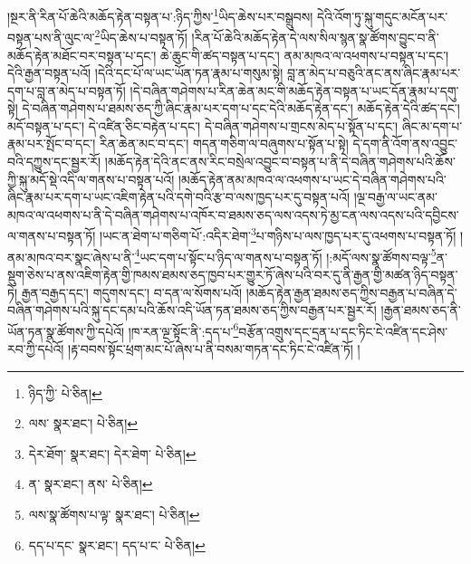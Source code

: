 །སྔར་ནི་རིན་པོ་ཆེའི་མཆོད་རྟེན་བསྟན་པ་:ཉིད་ཀྱིས་\footnote{ཉིད་ཀྱི་  པེ་ཅིན། }ཡིད་ཆེས་པར་བསྒྲུབས། དེའི་འོག་ཏུ་སྐུ་གདུང་མངོན་པར་བསྟན་པས་ནི་ལུང་ལ་\footnote{ལས་  སྣར་ཐང་།  པེ་ཅིན། }ཡིད་ཆེས་པ་བསྟན་ཏོ། །རིན་པོ་ཆེའི་མཆོད་རྟེན་དེ་ལས་སིལ་སྙན་སྣ་ཚོགས་བྱུང་བ་ནི་མཆོད་རྟེན་མཐོང་བར་བསྟན་པ་དང་། ཆེ་ཆུང་གི་ཚད་བསྟན་པ་དང་། ནམ་མཁའ་ལ་འཕགས་པ་བསྟན་པ་དང་། དེའི་རྒྱན་བསྟན་པའོ། །དེའི་དང་པོ་ལ་ཡང་ཡོན་ཏན་རྣམ་པ་གསུམ་སྟེ། བླ་ན་མེད་པ་བཅུའི་ནང་ནས་ཞིང་རྣམ་པར་དག་པ་བླ་ན་མེད་པ་བསྟན་ཏོ། །དེ་བཞིན་གཤེགས་པ་རིན་ཆེན་མང་གི་མཆོད་རྟེན་བསྟན་པ་ཡང་དོན་རྣམ་པ་དགུ་སྟེ། དེ་བཞིན་གཤེགས་པ་ཐམས་ཅད་ཀྱི་ཞིང་རྣམ་པར་དག་པ་དང་དེའི་མཆོད་རྟེན་དང་། མཆོད་རྟེན་དེའི་ཚད་དང་། མདོ་བསྟན་པ་དང་། དེ་འཛིན་ཅིང་བརྟེན་པ་དང་། དེ་བཞིན་གཤེགས་པ་གྲངས་མེད་པ་སྟོན་པ་དང་། ཞིང་མ་དག་པ་རྣམ་པར་སྤོང་བ་དང་། རིན་ཆེན་མང་བ་དང་། གདན་གཅིག་ལ་བཞུགས་པ་སྟོན་པ་སྟེ། དེ་དག་ནི་འོག་ནས་འབྱུང་བའི་དཀྱུས་དང་སྦྱར་རོ། །མཆོད་རྟེན་དེའི་ནང་ནས་རིང་བསྲེལ་འབྱུང་བ་བསྟན་པ་ནི་དེ་བཞིན་གཤེགས་པའི་ཆོས་ཀྱི་སྐུ་མདོ་སྡེ་འདི་ལ་གནས་པ་བསྟན་པའོ། །མཆོད་རྟེན་ནམ་མཁའ་ལ་འཕགས་པ་ཡང་དེ་བཞིན་གཤེགས་པའི་ཞིང་རྣམ་པར་དག་པ་ཡང་འཇིག་རྟེན་པའི་དགེ་བའི་རྩ་བ་ལས་ཁྱད་པར་དུ་བསྟན་པའོ། །ལྔ་བརྒྱ་ལ་ཡང་ནམ་མཁའ་ལ་འཕགས་པ་ནི་དེ་བཞིན་གཤེགས་པ་འཁོར་བ་ཐམས་ཅད་ལས་འདས་ཏེ་མྱ་ངན་ལས་འདས་པའི་དབྱིངས་ལ་གནས་པ་བསྟན་ཏོ། །ཡང་ན་ཐེག་པ་གཅིག་པོ་:འདིར་ཐེག་\footnote{དེར་ཐོག་  སྣར་ཐང་། དེར་ཐེག་  པེ་ཅིན། }པ་གཉིས་པ་ལས་ཁྱད་པར་དུ་འཕགས་པ་བསྟན་ཏོ། །ནམ་མཁའ་བར་སྣང་ཞེས་པ་ནི་\footnote{ན་  སྣར་ཐང་། ནས་  པེ་ཅིན། }ཡང་དག་པ་སྟོང་པ་ཉིད་ལ་གནས་པ་བསྟན་ཏོ། །:མདོ་ལས་སྣ་ཚོགས་བལྟ་\footnote{ལས་སྣ་ཚོགས་པ་ལྟ་  སྣར་ཐང་།  པེ་ཅིན། }ན་སྡུག་ཅེས་པ་ནས་འཇིག་རྟེན་གྱི་ཁམས་ཐམས་ཅད་ཁྱབ་པར་གྱུར་ཏོ་ཞེས་པའི་བར་དུ་ནི་རྒྱན་གྱི་མཚན་ཉིད་བསྟན་ཏེ། རྒྱན་བརྒྱད་དང་། གདུགས་དང་། བ་དན་ལ་སོགས་པའོ། །མཆོད་རྟེན་རྒྱན་ཐམས་ཅད་ཀྱིས་བརྒྱན་པ་བཞིན་དེ་བཞིན་གཤེགས་པའི་སྐུ་དང་དམ་པའི་ཆོས་འདི་ཡོན་ཏན་ཐམས་ཅད་ཀྱིས་བརྒྱན་པར་སྦྱར་རོ། །རྒྱན་ཐམས་ཅད་ནི་ཡོན་ཏན་སྣ་ཚོགས་ཀྱི་དཔེའོ། །ཁ་རན་ལྔ་སྟོང་ནི་:དད་པ་\footnote{དད་པ་དང་  སྣར་ཐང་། དད་པ་ང་  པེ་ཅིན། }བརྩོན་འགྲུས་དང་དྲན་པ་དང་ཏིང་ངེ་འཛིན་དང་ཤེས་རབ་ཀྱི་དཔེའོ། །རྟ་བབས་སྟོང་ཕྲག་མང་པོ་ཞེས་པ་ནི་བསམ་གཏན་དང་ཏིང་ངེ་འཛིན་ཏོ། །
